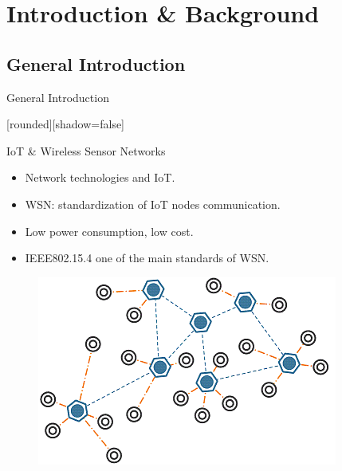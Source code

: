 \section{Introduction \& Background}

\subsection{General Introduction}
\begin{withoutheadline}
\begin{frame}{ General Introduction}


[rounded][shadow=false]

\begin{block}{ IoT \& Wireless Sensor Networks}
    \begin{itemize}
    \item Network technologies and IoT. 
    \item<2-> WSN: standardization of IoT nodes communication.
    \item<3-> Low power consumption, low cost.
    \item<4->  IEEE802.15.4 one of the main standards of WSN. 
    \end{itemize}
    \end{block}

 \begin{figure}[p]

\includegraphics[width=0.5\linewidth]{figures/wsn.png}
  
\end{figure}

\end{frame}
\end{withoutheadline}

